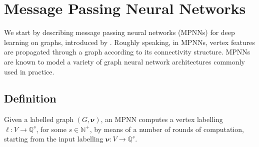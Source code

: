 
\section{Message Passing Neural Networks}\label{sec:MPNNs}
We start by describing message passing neural networks (MPNNs) for  deep
learning on graphs, introduced by \cite{GilmerSRVD17}. Roughly speaking, in
MPNNs, vertex features are propagated through a graph according to its
connectivity structure. MPNNs are known to model a variety of graph neural
network architectures commonly used in practice.

\subsection{Definition}
Given a labelled graph $( G,\pmb{\nu})$, an MPNN computes a vertex
labelling $\pmb{\ell}:V\to \mathbb{Q}^{s}$, for some $s\in\mathbb{N}^+$, by
means of a number of rounds of computation, starting from the input labelling
$\pmb{\nu}:V\to\mathbb{Q}^s$.

